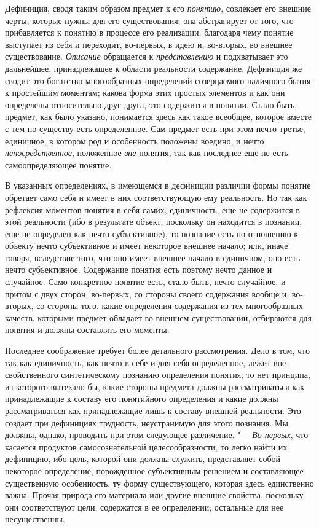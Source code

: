 Дефиниция, сводя таким образом предмет к его
{\em понятию}, совлекает
его внешние черты, которые нужны для его существования; она абстрагирует от
того, что прибавляется к понятию в процессе его реализации, благодаря чему
понятие выступает из себя и переходит, во-первых, в идею и, во-вторых, во
внешнее существование. {\em Описание}
обращается к
{\em представлению} и
подхватывает это дальнейшее, принадлежащее к области реальности содержание.
Дефиниция же сводит это богатство многообразных определений созерцаемого
наличного бытия к простейшим моментам; какова форма этих простых элементов
и как они определены относительно друг друга, это содержится в понятии.
Стало быть, предмет, как было указано, понимается здесь как такое всеобщее,
которое вместе с тем по существу есть определенное. Сам предмет есть при
этом нечто третье, единичное, в котором род и особенность
положены воедино, и нечто
{\em непосредственное},
положенное {\em вне}
понятия, так как последнее еще не есть самоопределяющее
понятие.

В указанных определениях, в имеющемся в дефиниции различии
формы понятие обретает само себя и имеет в них соответствующую ему
реальность. Но так как рефлексия моментов понятия в себя самих,
единичность, еще не содержится в этой реальности (ибо в результате объект,
поскольку он находится в познании, еще не определен как нечто
субъективное), то познание есть по отношению к объекту нечто субъективное и
имеет некоторое внешнее начало; или, иначе говоря, вследствие того, что оно
имеет внешнее начало в единичном, оно есть нечто субъективное. Содержание
понятия есть поэтому нечто данное и случайное. Само конкретное понятие
есть, стало быть, нечто случайное, и притом с двух сторон: во-первых, со
стороны своего содержания вообще и, во-вторых, со стороны того, какие
определения содержания из тех многообразных качеств, которыми предмет
обладает во внешнем существовании, отбираются для понятия и должны
составлять его моменты.

Последнее соображение требует более детального рассмотрения.
Дело в том, что так как единичность, как нечто
в-себе-и-для-себя определенное, лежит вне свойственного
синтетическому познанию определения понятия, то нет принципа, из которого
вытекало бы, какие стороны предмета должны рассматриваться как
принадлежащие к составу его понятийного определения и какие должны
рассматриваться как принадлежащие лишь к составу внешней реальности. Это
создает при дефинициях трудность, неустранимую для этого познания. Мы
должны, однако, проводить при этом следующее различение. "---
{\em Во-первых}, что
касается продуктов самосознательной целесообразности, то легко найти их
дефиницию, ибо цель, которой они должны служить, представляет собой
некоторое определение, порожденное субъективным решением и составляющее
существенную особенность, ту форму существующего, которая здесь единственно
важна. Прочая природа его материала или другие внешние свойства, поскольку
они соответствуют цели, содержатся в ее определении; остальные для нее
несущественны.

